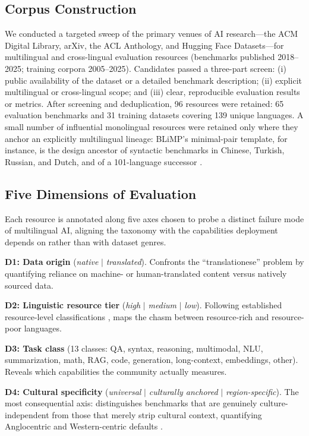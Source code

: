 \documentclass[letterpaper]{article} %
\begin{document}
\subsection{Corpus Construction}
We conducted a targeted sweep of the primary venues of AI research---the ACM Digital Library, arXiv, the ACL Anthology, and Hugging Face Datasets---for multilingual and cross-lingual evaluation resources (benchmarks published 2018--2025; training corpora 2005--2025). Candidates passed a three-part screen: (i) public availability of the dataset or a detailed benchmark description; (ii) explicit multilingual or cross-lingual scope; and (iii) clear, reproducible evaluation results or metrics. After screening and deduplication, 96 resources were retained: 65 evaluation benchmarks and 31 training datasets covering 139 unique languages. A small number of influential monolingual resources were retained only where they anchor an explicitly multilingual lineage: BLiMP's minimal-pair template, for instance, is the design ancestor of syntactic benchmarks in Chinese, Turkish, Russian, and Dutch, and of a 101-language successor \cite{warstadt2020blimp,liu2024zhoblimpsystematicassessmentlanguage,basar2025turblimp,taktasheva-etal-2024-rublimp,frank_suijkerbuijk_prins_de_heer_kloots_zuidema_2025,jumelet2025multiblimp10massivelymultilingual}.
 
\subsection{Five Dimensions of Evaluation}
Each resource is annotated along five axes chosen to probe a distinct failure mode of multilingual AI, aligning the taxonomy with the capabilities deployment depends on rather than with dataset genres.
 
\textbf{D1: Data origin} (\emph{native} $|$ \emph{translated}). Confronts the ``translationese'' problem by quantifying reliance on machine- or human-translated content versus natively sourced data.
 
\textbf{D2: Linguistic resource tier} (\emph{high} $|$ \emph{medium} $|$ \emph{low}). Following established resource-level classifications \cite{joshi2020state}, maps the chasm between resource-rich and resource-poor languages.
 
\textbf{D3: Task class} (13 classes: QA, syntax, reasoning, multimodal, NLU, summarization, math, RAG, code, generation, long-context, embeddings, other). Reveals which capabilities the community actually measures.
 
\textbf{D4: Cultural specificity} (\emph{universal} $|$ \emph{culturally anchored} $|$ \emph{region-specific}). The most consequential axis: distinguishes benchmarks that are genuinely culture-independent from those that merely strip cultural context, quantifying Anglocentric and Western-centric defaults \cite{singh2024global}.
 
\end{document}
